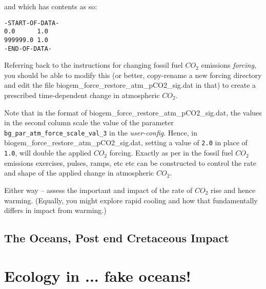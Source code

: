 \documentclass[11pt,fleqn]{book} %
\begin{document}
\begin{enumerate}[noitemsep]
\vspace{8mm}
\pagebreak

and which has contents as so:
\vspace{-1mm}\small\begin{verbatim}
-START-OF-DATA-
0.0      1.0
999999.0 1.0
-END-OF-DATA-
\end{verbatim}\normalsize\vspace{-1mm}

Referring back to the instructions for changing fossil fuel \(CO_{2}\) emissions \textit{forcing}, you should be able to modify this (or better, copy-rename a new forcing directory and edit the file \textsf{\footnotesize biogem\_force\_restore\_atm\_pCO2\_sig.dat} in that) to create a prescribed time-dependent change in atmospheric \(CO_{2}\).

Note that in the format of \textsf{\footnotesize biogem\_force\_restore\_atm\_pCO2\_sig.dat}, the values in the second column scale the value of the parameter \texttt{bg\_par\_atm\_force\_scale\_val\_3} in the \textit{user-config}. Hence, in \textsf{\footnotesize biogem\_force\_restore\_atm\_pCO2\_sig.dat}, setting a value of \texttt{2.0} in place of \texttt{1.0}, will double the applied \(CO_{2}\) forcing. Exactly as per in the fossil fuel \(CO_{2}\) emissions exercises, pulses, ramps, etc etc can be constructed to control the rate and shape of the applied change in atmospheric \(CO_{2}\).

\end{enumerate}

\vspace{2mm}

\noindent Either way --  assess the important and impact of the rate of \(CO_{2}\) rise and hence warming. (Equally, you might explore rapid cooling and how that fundamentally differs in impact from warming.)

\newpage
\subsection*{The Oceans, Post end Cretaceous Impact}




\newpage


\section{Ecology in ... fake oceans!}
\end{document}
